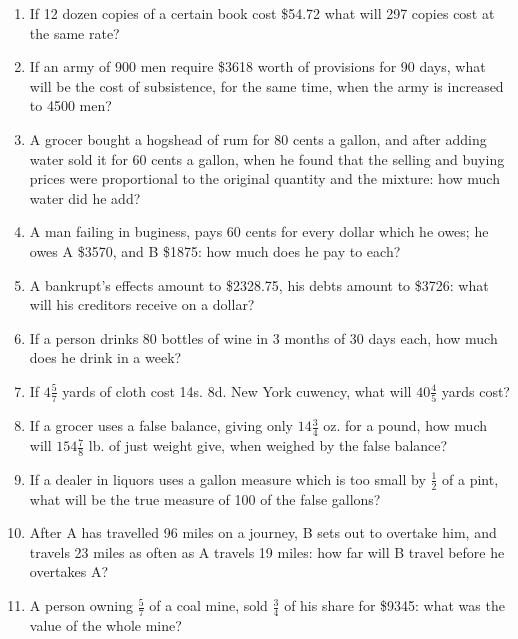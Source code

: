 \documentclass[12pt]{article}
\begin{document}
\begin{enumerate}
\item If 12 dozen copies of a certain book cost \$54.72 what will 297 copies cost at the same rate? 
\spacing

\item If an army of 900 men require \$3618 worth of provisions for 90 days, what will be the cost of subsistence, for the same time, when the army is increased to 4500 men? 
\spacing

\item A grocer bought a hogshead of rum for 80 cents a gallon, and after adding water sold it for 60 cents a gallon, when he found that the selling and buying prices were proportional to the original quantity and the mixture: how much water did he add? 
\spacing

\item A man failing in buginess, pays 60 cents for every dollar which he owes; he owes A \$3570, and B \$1875: how much does he pay to each? 
\spacing

\item A bankrupt's effects amount to \$2328.75, his debts amount to \$3726: what will his creditors receive on a dollar? 
\spacing

\item If a person drinks 80 bottles of wine in 3 months of 30 days each, how much does he drink in a week? 
\spacing

\item If $4\frac{5}{7}$ yards of cloth cost 14s. 8d. New York cuwency, what will $40\frac{4}{5}$ yards cost?  
\spacing

\item If a grocer uses a false balance, giving only $14\frac{3}{4}$ oz. for a pound, how much will $154\frac{7}{8}$ lb. of just weight give, when weighed by the false balance? 
\spacing

\item If a dealer in liquors uses a gallon measure which is too small by $\frac{1}{2}$ of a pint, what will be the true measure of 100 of the false gallons? 
\spacing

\item After A has travelled 96 miles on a journey, B sets out to overtake him, and travels 23 miles as often as A travels 19 miles: how far will B travel before he overtakes A? 
\spacing

\item A person owning $\frac{5}{7}$ of a coal mine, sold $\frac{3}{4}$ of his share for \$9345: what was the value of the whole mine? 
\spacing


\end{enumerate}
\end{document}
